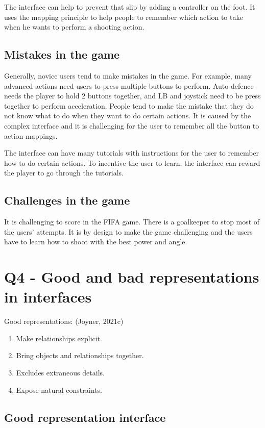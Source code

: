 \documentclass[
	letterpaper, %
]{jdf}
\begin{document}
The interface can help to prevent that slip by adding a controller on the foot. It uses the mapping principle to help people to remember which action to take when he wants to perform a shooting action.

\subsection{Mistakes in the game}
Generally, novice users tend to make mistakes in the game. For example, many advanced actions need users to press multiple buttons to perform. Auto defence needs the player to hold 2 buttons together, and LB and joystick need to be press together to perform acceleration. People tend to make the mistake that they do not know what to do when they want to do certain actions. It is caused by the complex interface and it is challenging for the user to remember all the button to action mappings.

The interface can have many tutorials with instructions for the user to remember how to do certain actions. To incentive the user to learn, the interface can reward the player to go through the tutorials.

\subsection{Challenges in the game}
It is challenging to score in the FIFA game. There is a goalkeeper to stop most of the users' attempts. It is by design to make the game challenging and the users have to learn how to shoot with the best power and angle. 

\section{Q4 - Good and bad representations in interfaces}
Good representations: (Joyner, 2021c)
\begin{enumerate}
	\item Make relationships explicit.
	\item Bring objects and relationships together.
	\item Excludes extraneous details.
	\item Expose natural constraints.
\end{enumerate}


\subsection{Good representation interface}
\end{document}
